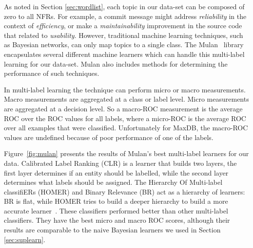 \documentclass[]{sig-alternate}
\begin{document}
As noted in Section \ref{sec:wordlist}, each topic in our data-set can be composed of zero to all NFRs. For example, a commit message might address \textit{reliability} in the context of \textit{efficiency}, or make a \textit{maintainability} improvement in the source code that related to \textit{usability}. However, traditional machine learning techniques, such as Bayesian networks, can only map topics to a single class. The Mulan~\cite{mulan} library encapsulates several different machine learners which can handle this multi-label learning for our data-set. Mulan also includes methods for determining the performance of such techniques.

In multi-label learning the technique can perform micro or macro measurements. Macro measurements are aggregated at a class or label level. Micro measurements are aggregated at a decision level. 
 So a macro-ROC measurement is the average ROC over the ROC values for all labels, where a micro-ROC is the average ROC over all examples that were classified. Unfortunately for MaxDB, the macro-ROC values are undefined because of poor performance of one of the labels.

Figure~\ref{fig:mulan} presents the results of Mulan's best multi-label
learners for our data. Calibrated Label Ranking (CLR) is a learner
that builds two layers, the first layer determines if an entity should
be labelled, while the second layer determines what labels should be assigned.
The Hierarchy Of Multi-label classifiERs (HOMER) and Binary Relevance (BR) act as a hierarchy of learners: BR is flat, while HOMER tries to build a deeper hierarchy to build a more accurate learner~\cite{mulan}. These classifiers performed better than other multi-label classifiers. They have the best micro and macro ROC scores, although their results are comparable to the naive Bayesian learners we used in Section \ref{sec:suplearn}.
\end{document}
